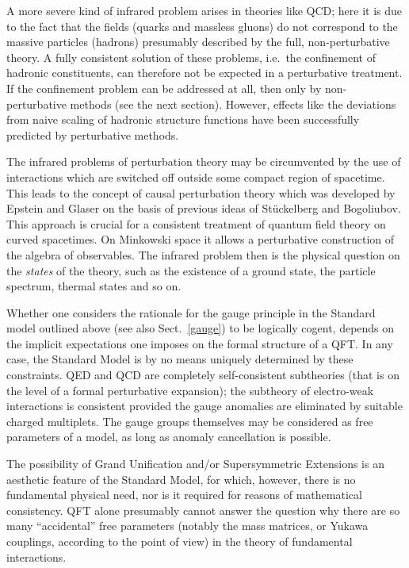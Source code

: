 \documentclass[multphys,vecphys]{svmult}
\begin{document}
A more severe kind of infrared problem arises
in theories like QCD; here it is due to the fact that the
fields (quarks and massless gluons) do not correspond to the massive
particles (hadrons) presumably described by the full,
non-perturbative theory. A fully consistent solution of these
problems, i.e.\ the confinement of hadronic
constituents, can therefore not be expected in a perturbative
treatment. If the confinement problem can be addressed at all, then
only by non-perturbative methods (see
the next section). However, effects like the deviations from naive
scaling of hadronic structure functions have been successfully predicted by
perturbative methods. 

The infrared problems of
perturbation theory may be circumvented by
the use of interactions which are switched off outside some compact
region of spacetime. This leads to the concept of causal
perturbation theory which was
developed by Epstein and Glaser \cite{EG} on the basis of previous
ideas of St\"uckelberg and Bogoliubov. This approach is crucial for a
consistent treatment of quantum field theory on curved spacetimes. On Minkowski space it allows a perturbative 
construction of the algebra of observables. The infrared problem then
is the physical question on the {\em states} of the theory, such as the
existence of a ground state, the
particle spectrum, thermal
states and so on.  

Whether one considers the rationale for the gauge principle in the Standard model outlined above (see also
Sect.~\ref{gauge}) to be logically cogent, depends on the implicit
expectations one imposes on the formal structure of a QFT. In any
case, the Standard Model is by no means uniquely determined by these
constraints. QED and QCD are completely
self-consistent subtheories (that is on the level of a formal
perturbative expansion); the subtheory of electro-weak interactions is consistent provided the gauge
anomalies are eliminated by suitable charged
multiplets. The gauge groups themselves may be considered as free
parameters of a model, as long as anomaly cancellation is possible. 

The possibility of Grand Unification and/or
Supersymmetric Extensions is an aesthetic feature
of the Standard Model, for which, however, there is no fundamental
physical need, nor is it required for reasons of mathematical
consistency. QFT alone presumably cannot answer the question why there
are so many ``accidental'' free parameters (notably the mass matrices,
or Yukawa couplings, according to the point of view) in the theory of
fundamental interactions.  
\end{document}
